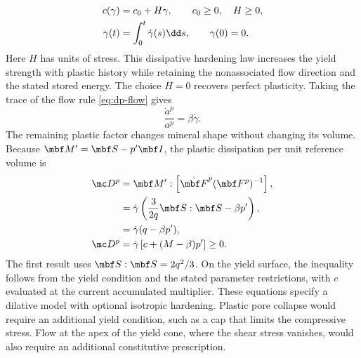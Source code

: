 \begin{align}
 c(\gamma)&=c_0+H\gamma,
 \qquad c_0\geq0,\quad H\geq0,
 \label{eq:plastic-isotropic-hardening}\\
 \gamma(t)&=\int_0^t\dot\gamma(s)\dd s,
 \qquad \gamma(0)=0.
 \notag
\end{align}
Here \(H\) has units of stress.  This dissipative hardening law increases
the yield strength with plastic history while retaining the nonassociated
flow direction and the stated stored energy.  The choice \(H=0\) recovers
perfect plasticity.  Taking the trace of the flow rule \eqref{eq:dp-flow} gives
\begin{equation*}
 \frac{\dot a^p}{a^p}=\beta\dot\gamma.
\end{equation*}
The remaining plastic factor changes mineral shape without changing its
volume.  Because
\(\mbf M^{\prime}=\mbf S-p^{\prime}\mbf I\), the plastic dissipation per unit
reference volume is
\begin{align*}
 \mc D^p
 &=\mbf M^{\prime}:\left[\dot{\mbf F}^p(\mbf F^p)^{-1}\right], \\
 &=\dot\gamma\left(
 \frac{3}{2q}\mbf S:\mbf S-\beta p^{\prime}\right), \\
 &=\dot\gamma(q-\beta p^{\prime}),
\\
 \mc D^p&=\dot\gamma\left[c+(M-\beta)p^{\prime}\right]\geq0.
\end{align*}
The first result uses \(\mbf S:\mbf S=2q^2/3\).  On the yield surface, the
inequality follows from the yield condition and the stated parameter
restrictions, with \(c\) evaluated at the current accumulated multiplier.
These equations specify a dilative model with optional isotropic hardening.
Plastic pore collapse would require an additional yield condition, such as
a cap that limits the compressive stress.  Flow at the apex of the yield
cone, where the shear stress vanishes, would also require an additional
constitutive prescription.

